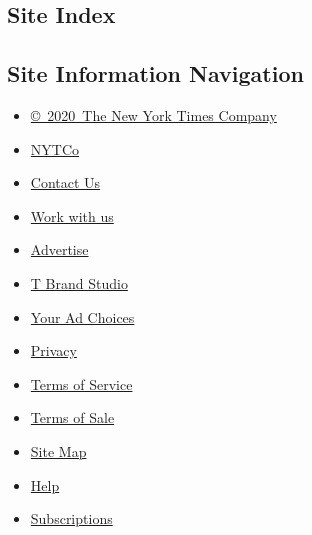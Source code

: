 \hypertarget{site-index}{%
\subsection{Site Index}\label{site-index}}

\hypertarget{site-information-navigation}{%
\subsection{Site Information
Navigation}\label{site-information-navigation}}

\begin{itemize}
\tightlist
\item
  \href{https://help.nytimes.com/hc/en-us/articles/115014792127-Copyright-notice}{©~2020~The
  New York Times Company}
\end{itemize}

\begin{itemize}
\tightlist
\item
  \href{https://www.nytco.com/}{NYTCo}
\item
  \href{https://help.nytimes.com/hc/en-us/articles/115015385887-Contact-Us}{Contact
  Us}
\item
  \href{https://www.nytco.com/careers/}{Work with us}
\item
  \href{https://nytmediakit.com/}{Advertise}
\item
  \href{http://www.tbrandstudio.com/}{T Brand Studio}
\item
  \href{https://www.nytimes.com/privacy/cookie-policy\#how-do-i-manage-trackers}{Your
  Ad Choices}
\item
  \href{https://www.nytimes.com/privacy}{Privacy}
\item
  \href{https://help.nytimes.com/hc/en-us/articles/115014893428-Terms-of-service}{Terms
  of Service}
\item
  \href{https://help.nytimes.com/hc/en-us/articles/115014893968-Terms-of-sale}{Terms
  of Sale}
\item
  \href{https://spiderbites.nytimes.com}{Site Map}
\item
  \href{https://help.nytimes.com/hc/en-us}{Help}
\item
  \href{https://www.nytimes.com/subscription?campaignId=37WXW}{Subscriptions}
\end{itemize}
